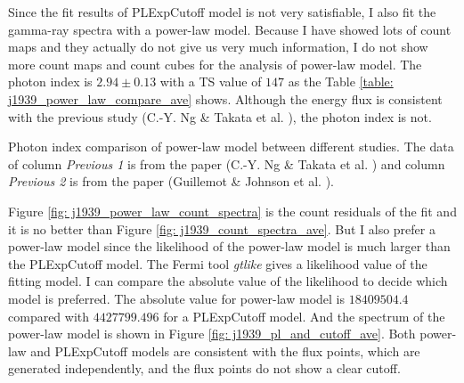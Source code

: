 \documentclass[12pt]{report}
\newcommand{\mycaption}[1]{\protect \caption{#1}}
\begin{document}
        Since the fit results of PLExpCutoff model is not very satisfiable, I also fit the 
        gamma-ray spectra with a power-law model. Because I have showed lots of count maps 
        and they actually do not give us very much information, I do not show more count maps 
        and count cubes for the analysis of power-law model. The photon index is 
        $2.94\pm0.13$ with a TS value of $147$ as the Table 
        \ref{table: j1939_power_law_compare_ave} shows. Although the energy flux is consistent 
        with the previous study (C.-Y. Ng \& Takata et al. \cite{0004-637X-787-2-167}), the photon 
        index is not.
        \begin{table}[!htp]
          \centering
            \mycaption{Photon index comparison of power-law model between different 
              studies. The data of column \textit{Previous 1} is from the paper 
              (C.-Y. Ng \& Takata et al. \cite{0004-637X-787-2-167}) and column \textit{Previous 2}
              is from the paper (Guillemot \& Johnson et al. \cite{J1939_old}).}
            \label{table: j1939_power_law_compare_ave}        
        \end{table}  

        Figure \ref{fig: j1939_power_law_count_spectra} is the count residuals of the fit and 
        it is no better than Figure \ref{fig: j1939_count_spectra_ave}. But I also prefer a 
        power-law model since the likelihood of the power-law model is much larger than the 
        PLExpCutoff model. The Fermi tool \textit{gtlike} gives a likelihood value of the 
        fitting model. I can compare the absolute value of the likelihood to decide which model 
        is preferred. The absolute value for power-law model is $18409504.4$ compared with 
        $4427799.496$ for a PLExpCutoff model. And the spectrum of the power-law model is 
        shown in Figure \ref{fig: j1939_pl_and_cutoff_ave}. Both power-law and PLExpCutoff 
        models are consistent with the flux points, which are generated independently, and 
        the flux points do not show a clear cutoff. 
\end{document}
